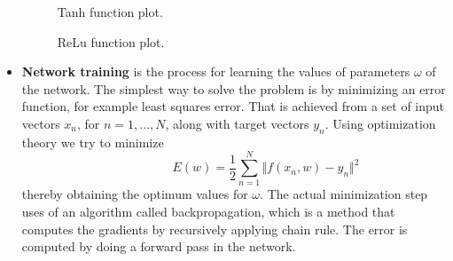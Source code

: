 \begin{itemize}
\begin{figure}[!tb] 
\centering 
{}
\caption{Tanh function plot.}
\label{fig:tanhfun1} 
\end{figure}

\begin{figure}[!tb] 
\centering 
{}
\caption{ReLu function plot.}
\label{fig:ReLu1} 
\end{figure}


\item \textbf{Network training} is the process for learning the values of parameters $\omega$ of the network. The simplest way to solve the problem is by minimizing an error function, for example least squares error. That is achieved from a set of input vectors $x_n$, for $n = 1,...,N$, along with target vectors $y_n$. Using optimization theory we try to minimize 
\begin{equation} \label{eq:LS1}
\hspace{3em} \hspace{3em} \hspace{3em} E (w) = \frac{1}{2} \sum\limits_{n=1}^N \Vert f(x_n,w) - y_n\Vert^2 \enspace \enspace \hspace{3em}
\end{equation} 
thereby obtaining the optimum values for $\omega$. The actual minimization step uses of an algorithm called backpropagation, which is a method that computes the gradients by recursively applying chain rule. The error is computed by doing a forward pass in the network.  


\end{itemize}
